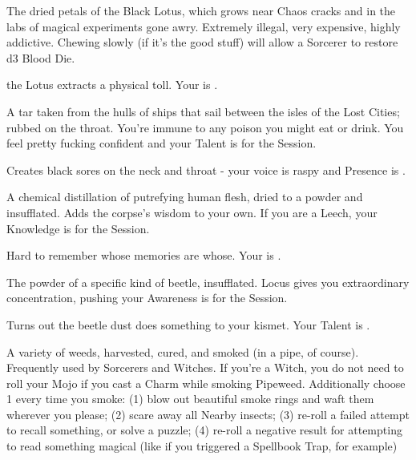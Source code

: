 {\begin{multicols}{2}

  The dried petals of the Black Lotus, which grows near Chaos cracks and in the labs of magical experiments gone awry. Extremely illegal, very expensive, highly addictive.  Chewing slowly (if it's the good stuff) will allow a Sorcerer to restore d3 Blood Die.

    the Lotus extracts a physical toll.  Your \MAX \VIG is \DCDOWN.


  A tar taken from the hulls of ships that sail between the isles of the Lost Cities; rubbed on the throat. You're immune to any poison you might eat or drink. You feel pretty fucking confident and your \MAX Talent is \DCUP for the Session.

     Creates black sores on the neck and throat - your voice is raspy and \MAX Presence is \DCDOWN.

  \newpage


  A chemical distillation of putrefying human flesh, dried to a powder and insufflated. Adds the corpse's wisdom to your own. If you are a Leech, your Knowledge \STATIC is \DCUP for the Session.

     Hard to remember whose memories are whose.  Your \MAX \FOC is \DCDOWN.


  The powder of a specific kind of beetle, insufflated.  Locus gives you extraordinary concentration, pushing your \MAX Awareness is \DCUP for the Session.

    Turns out the beetle dust does something to your kismet.   Your \MAX Talent is \DCDOWN.



  A variety of weeds, harvested, cured, and smoked (in a pipe, of course). Frequently used by Sorcerers and Witches. If you're a Witch, you do not need to roll your Mojo if you cast a Charm while smoking Pipeweed.  Additionally choose 1 every time you smoke: (1) blow out beautiful smoke rings and waft them wherever you please; (2) scare away all Nearby insects; (3) re-roll a failed attempt to recall something, or solve a puzzle; (4) re-roll a negative result for attempting to read something magical (like if you triggered a Spellbook Trap, for example)


\end{multicols}}
